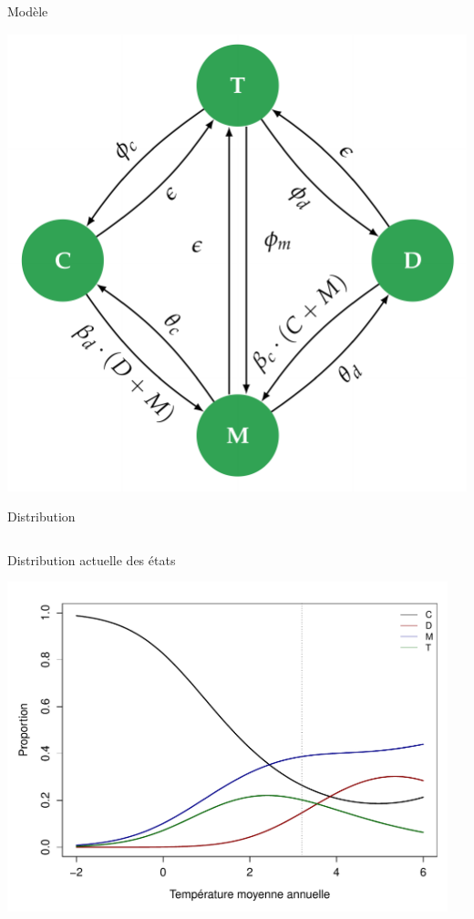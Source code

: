 \documentclass{eecslides}
\begin{document}
	\begin{frame}{Modèle}
		\begin{center}
			\includegraphics[height=0.6\textheight]{model}
		\end{center}
	\end{frame}


		\begin{frame}{Distribution}
		\begin{columns}
			\begin{column}{0.5\textwidth}
				Distribution actuelle des états
								\begin{center}
					\includegraphics[height=0.4\textheight]{SDM}
				\end{center}
			\end{column}
			\begin{column}{0.5\textwidth}
			\end{column}
		\end{columns}	    	
	\end{frame}
\end{document}

